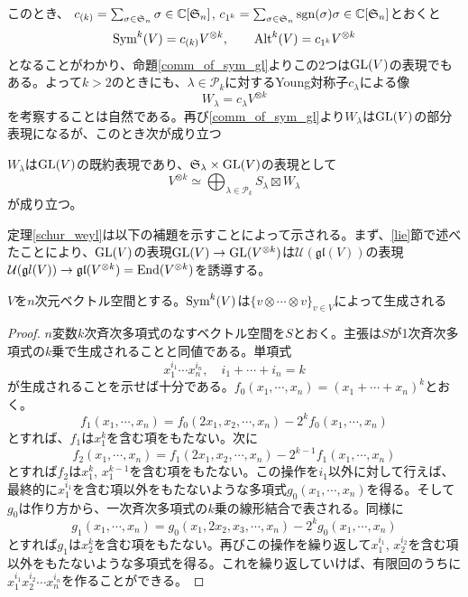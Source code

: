 \documentclass{ltjsreport}
\begin{document}
このとき、
$c_{(k)}=\sum_{\sigma\in \mathfrak{S}_n}\sigma\in\mathbb{C}[\mathfrak{S}_n]$, $c_{1^k}=\sum_{\sigma\in \mathfrak{S}_n}\mathrm{sgn}(\sigma)\sigma\in\mathbb{C}[\mathfrak{S}_n]$とおくと
\[
\text{Sym}^k(V)=c_{(k)}V^{\otimes k},\qquad\text{Alt}^k(V)=c_{1^k}V^{\otimes k}
\]
となることがわかり、命題\ref{comm_of_sym_gl}よりこの2つは$\text{GL}(V)$の表現でもある。よって$k>2$のときにも、$\lambda\in\mathcal{P}_k$に対するYoung対称子$c_\lambda$による像
\[
W_\lambda=c_\lambda V^{\otimes k}  
\]
を考察することは自然である。再び\ref{comm_of_sym_gl}より$W_\lambda$は$\text{GL}(V)$の部分表現になるが、このとき次が成り立つ

\begin{theo}\label{schur_weyl}
  $W_\lambda$は$\text{GL}(V)$の既約表現であり、$\mathfrak{S}_\lambda\times\text{GL}(V)$の表現として
  \[
  V^{\otimes k}\simeq \bigoplus_{\lambda\in\mathcal{P}_k}S_\lambda\boxtimes W_\lambda  
  \]
  が成り立つ。
\end{theo}

定理\ref{schur_weyl}は以下の補題を示すことによって示される。まず、\ref{lie}節で述べたことにより、$\text{GL}(V)$の表現$\text{GL}(V)\rightarrow \text{GL}(V^{\otimes k})$は$\mathcal{U}(\mathfrak{gl}(V))$の表現$\mathcal{U}(\mathfrak
gl(V))\rightarrow \mathfrak{gl}(V^{\otimes k})=\text{End}(V^{\otimes k})$を誘導する。

\begin{lemm}\label{gen_of_symtensor}
  $V$を$n$次元ベクトル空間とする。$\text{Sym}^k(V)$は$\{v\otimes\cdots\otimes v\}_{v\in V}$によって生成される
\end{lemm}

\begin{proof}
  $n$変数$k$次斉次多項式のなすベクトル空間を$S$とおく。主張は$S$が1次斉次多項式の$k$乗で生成されることと同値である。単項式
  \[
  x_1^{i_1}\cdots x_n^{i_n},\quad i_1+\cdots+i_n=k
  \]
  が生成されることを示せば十分である。$f_0(x_1,\cdots,x_n)=(x_1+\cdots +x_n)^k$とおく。
  \[
  f_1(x_1,\cdots,x_n)=f_0(2x_1,x_2,\cdots,x_n)-2^{k}f_0(x_1,\cdots,x_n)  
  \]
  とすれば、$f_1$は$x_1^k$を含む項をもたない。次に
  \[
  f_2(x_1,\cdots,x_n)=f_1(2x_1,x_2,\cdots,x_n)-2^{k-1}f_1(x_1,\cdots,x_n)  
  \]
  とすれば$f_2$は$x_1^{k}$, $x_1^{k-1}$を含む項をもたない。この操作を$i_1$以外に対して行えば、最終的に$x_1^{i_1}$を含む項以外をもたないような多項式$g_0(x_1,\cdots,x_n)$を得る。そして$g_0$は作り方から、一次斉次多項式の$k$乗の線形結合で表される。同様に
  \[
  g_1(x_1,\cdots,x_n)=g_0(x_1,2x_2,x_3,\cdots,x_n)-2^{k}g_0(x_1,\cdots,x_n)  
  \]
  とすれば$g_1$は$x_2^k$を含む項をもたない。再びこの操作を繰り返して$x_1^{i_1}$, $x_2^{i_2}$を含む項以外をもたないような多項式を得る。これを繰り返していけば、有限回のうちに$x_1^{i_1}x_2^{i_2}\cdots x_n^{i_n}$を作ることができる。
\end{proof}
\end{document}
